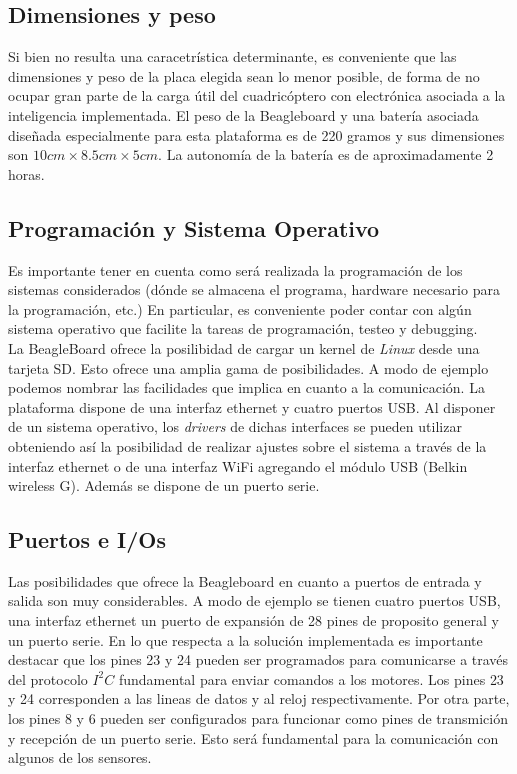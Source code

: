 \documentclass[main]{subfiles}
\begin{document}
\subsection*{Dimensiones y peso}

Si bien no resulta una caracetr\'istica determinante, es conveniente que las dimensiones y peso de la placa elegida sean lo menor posible, de forma de no ocupar gran parte de la carga \'util del cuadric\'optero con electr\'onica asociada a la inteligencia implementada. El peso de la Beagleboard y una bater\'ia asociada diseñada especialmente para esta plataforma es de 220 gramos y sus dimensiones son $10cm\times8.5cm\times5cm$. La autonom\'ia de la bater\'ia es de aproximadamente 2 horas. \\

\subsection*{Programaci\'on y Sistema Operativo}

Es importante tener en cuenta como ser\'a realizada la programaci\'on de los sistemas considerados (d\'onde se almacena el programa, hardware necesario para la programaci\'on, etc.) En particular, es conveniente poder contar con alg\'un sistema operativo que facilite la tareas de programaci\'on, testeo y debugging.\\

La BeagleBoard ofrece la posilibidad de cargar un kernel de \emph{Linux} desde una tarjeta SD. Esto ofrece una amplia gama de posibilidades. A modo de ejemplo podemos nombrar las facilidades que implica en cuanto a la comunicaci\'on. La plataforma dispone de una interfaz ethernet y cuatro puertos USB. Al disponer de un sistema operativo, los \emph{drivers} de dichas interfaces se pueden utilizar obteniendo as\'i la posibilidad de realizar ajustes sobre el sistema a trav\'es de la interfaz ethernet o de una interfaz WiFi agregando el m\'odulo USB (Belkin wireless G). Adem\'as se dispone de un puerto serie. 

\subsection*{Puertos e I/Os}

Las posibilidades que ofrece la Beagleboard en cuanto a puertos de entrada y salida son muy considerables. A modo de ejemplo se tienen cuatro puertos USB, una interfaz ethernet un puerto de expansi\'on de 28 pines de proposito general y un puerto serie. En lo que respecta a la soluci\'on implementada es importante destacar que los pines 23 y 24 pueden ser programados para comunicarse a trav\'es del protocolo $I^2C$ fundamental para enviar comandos a los motores. Los pines 23 y 24 corresponden a las lineas de datos y al reloj respectivamente. Por otra parte, los pines 8 y 6 pueden ser configurados para funcionar como pines de transmici\'on y recepci\'on de un puerto serie. Esto ser\'a fundamental para la comunicaci\'on con algunos de los sensores.\\
\end{document}
